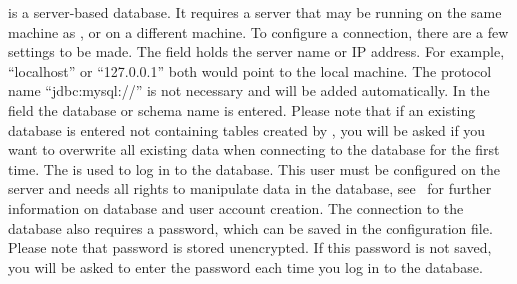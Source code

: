 \mysql is a server-based database.
It requires a \mysql server that may be running on the same machine as \sh, or on a different machine.
To configure a \mysql connection, there are a few settings to be made.
The  field holds the server name or IP address.
For example, ``localhost'' or ``127.0.0.1'' both would point to the local machine.
The protocol name ``jdbc:mysql://'' is not necessary and will be added automatically.
In the  field the database or schema name is entered.
Please note that if an existing database is entered not containing tables created
by \sh, you will be asked if you want to overwrite all existing data when connecting
to the database for the first time.
The  is used to log in to the database.
This user must be configured on the \mysql server and needs all rights to manipulate data in the database, see~ for further information on database and user account creation.
The connection to the database also requires a password, which can be saved in the configuration file.
Please note that password is stored unencrypted.
If this password is not saved, you will be asked to enter the password each time you log in to the database.
